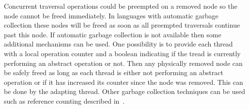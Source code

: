 Concurrent traversal operations could be preempted on a removed node so 
the node cannot be freed immediately.
In languages with automatic garbage collection these nodes will be freed as soon 
as all preempted traversals continue past this node.
If automatic garbage collection is not available then some additional mechanisms can be used.
One possibility is to provide each thread with a local operation counter and a boolean 
indicating if the tread is currently performing an abstract operation or not.
Then any physically removed node can be safely freed as long as each thread is either not performing an abstract operation or if it has increased its counter since the node was removed.
This can be done by the adapting thread.
Other garbage collection techniques can be used such as reference counting described in~\cite{DMM+01}.

% 
% 


